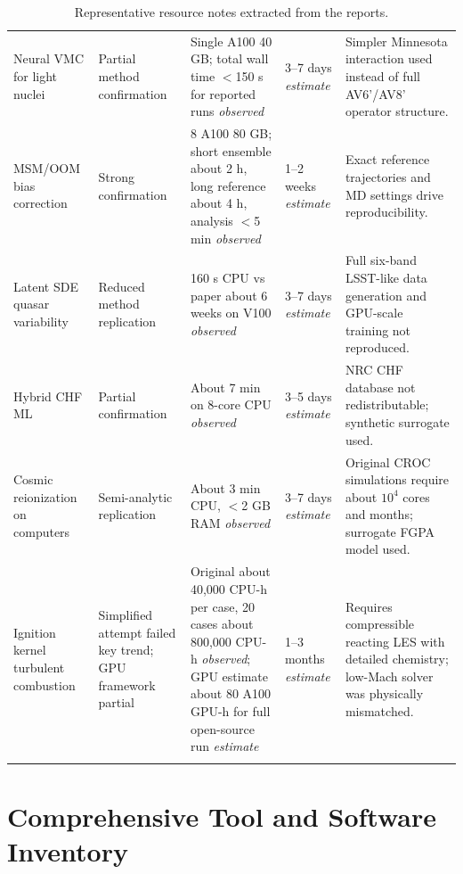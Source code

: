 \documentclass[11pt,letterpaper]{article}
\newcommand{\est}{\emph{estimate}}
\newcommand{\obs}{\emph{observed}}
\begin{document}
\begin{landscape}
\begin{longtable}{p{4.2cm}p{2.7cm}p{3.5cm}p{3.5cm}p{6.0cm}}
\addlinespace
Neural VMC for light nuclei & Partial method confirmation & Single A100 40 GB; total wall time $<$150 s for reported runs \obs{} & 3--7 days \est{} & Simpler Minnesota interaction used instead of full AV6'/AV8' operator structure. \\
\addlinespace
MSM/OOM bias correction & Strong confirmation & 8 A100 80 GB; short ensemble about 2 h, long reference about 4 h, analysis $<$5 min \obs{} & 1--2 weeks \est{} & Exact reference trajectories and MD settings drive reproducibility. \\
\addlinespace
Latent SDE quasar variability & Reduced method replication & 160 s CPU vs paper about 6 weeks on V100 \obs{} & 3--7 days \est{} & Full six-band LSST-like data generation and GPU-scale training not reproduced. \\
\addlinespace
Hybrid CHF ML & Partial confirmation & About 7 min on 8-core CPU \obs{} & 3--5 days \est{} & NRC CHF database not redistributable; synthetic surrogate used. \\
\addlinespace
Cosmic reionization on computers & Semi-analytic replication & About 3 min CPU, $<$2 GB RAM \obs{} & 3--7 days \est{} & Original CROC simulations require about $10^4$ cores and months; surrogate FGPA model used. \\
\addlinespace
Ignition kernel turbulent combustion & Simplified attempt failed key trend; GPU framework partial & Original about 40,000 CPU-h per case, 20 cases about 800,000 CPU-h \obs{}; GPU estimate about 80 A100 GPU-h for full open-source run \est{} & 1--3 months \est{} & Requires compressible reacting LES with detailed chemistry; low-Mach solver was physically mismatched. \\
\bottomrule
\caption{Representative resource notes extracted from the reports.}
\end{longtable}
\end{landscape}

\section{Comprehensive Tool and Software Inventory}
\end{document}
